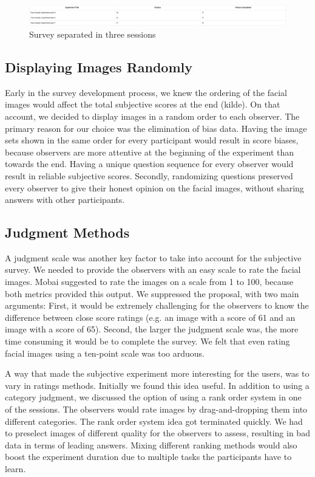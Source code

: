 \begin{figure}[h]
    \centering
    \includegraphics[scale = 0.2]{figures/three-sessions.png}
    \caption{Survey separated in three sessions}
    \label{fig:three-sessions}
\end{figure}

\subsection*{Displaying Images Randomly}
Early in the survey development process, we knew the ordering of the facial images would affect the total subjective scores at the end (kilde). On that account, we decided to display images in a random order to each observer. The primary reason for our choice was the elimination of bias data. Having the image sets shown in the same order for every participant would result in score biases, because observers are more attentive at the beginning of the experiment than towards the end. Having a unique question sequence for every observer would result in reliable subjective scores. Secondly, randomizing questions preserved every observer to give their honest opinion on the facial images, without sharing answers with other participants.

\subsection*{Judgment Methods}
A judgment scale was another key factor to take into account for the subjective survey. We needed to provide the observers with an easy scale to rate the facial images. Mobai suggested to rate the images on a scale from 1 to 100, because both metrics provided this output. We suppressed the proposal, with two main arguments: First, it would be extremely challenging for the observers to know the difference between close score ratings (e.g. an image with a score of 61 and an image with a score of 65). Second, the larger the judgment scale was, the more time consuming it would be to complete the survey. We felt that even rating facial images using a ten-point scale was too arduous. 

A way that made the subjective experiment more interesting for the users, was to vary in ratings methods. Initially we found this idea useful. In addition to using a category judgment, we discussed the option of using a rank order system in one of the sessions. The observers would rate images by drag-and-dropping them into different categories. The rank order system idea got terminated quickly. We had to preselect images of different quality for the observers to assess, resulting in bad data in terms of leading answers. Mixing different ranking methods would also boost the experiment duration due to multiple tasks the participants have to learn. 

